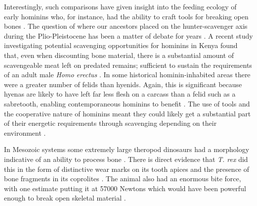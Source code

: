 \documentclass[a4paper,12pt]{article}
\begin{document}



Interestingly, such comparisons have given insight into the feeding ecology of early hominins who, for instance, had the ability to craft tools for breaking open bones \citep{ARCM:ARCM12084}.
The question of where our ancestors placed on the hunter-scavenger axis during the Plio-Pleistocene has been a matter of debate for years \citep{dominguez2002hunting}.
A recent study investigating potential scavenging opportunities for hominins in Kenya found that, even when discounting bone material, there is a substantial amount of scavengeable meat left on predated remains; sufficient to sustain the requirements of an adult male \textit{Homo erectus} \citep{pobiner2015new}.
In some historical hominin-inhabited areas there were a greater number of felids than hyenids.
Again, this is significant because hyenas are likely to have left far less flesh on a carcass than a felid such as a sabretooth, enabling contemporaneous hominins to benefit \citep{pobiner2015new}.
The use of tools and the cooperative nature of hominins meant they could likely get a substantial part of their energetic requirements through scavenging depending on their environment \citep{moleon2014humans}.


In Mesozoic systems some extremely large theropod dinosaurs had a morphology indicative of an ability to process bone \citep[e.g. the robust skull and dentition of \textit{Tyrannosaurus rex}][]{hone2010feeding}.
There is direct evidence that \textit{T. rex} did this in the form of distinctive wear marks on its tooth apices \citep{farlow1994wear,schubert2005wear} and the presence of bone fragments in its coprolites \citep{chin1998king}.
The animal also had an enormous bite force, with one estimate putting it at 57000 Newtons \citep{bates2012estimating} which would have been powerful enough to break open skeletal material \citep{rayfield2001cranial}.
\end{document}
